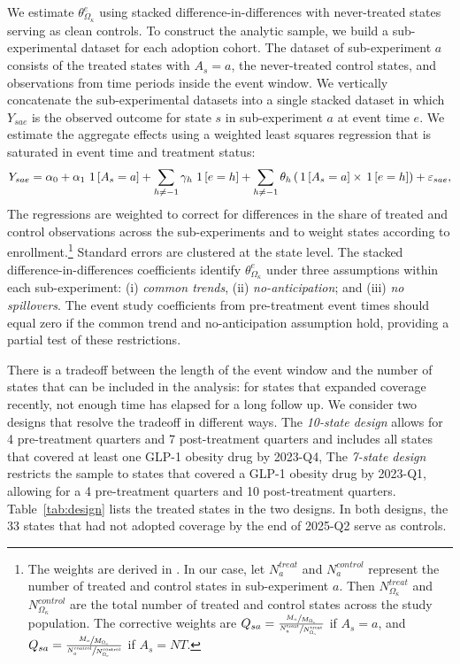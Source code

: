 We estimate $\theta_{\Omega_{\kappa}}^{e}$ using stacked difference-in-differences with never-treated states serving as clean controls. To construct the analytic sample, we build a sub-experimental dataset for each adoption cohort. The dataset of sub-experiment $a$ consists of the treated states with $A_s = a$, the never-treated control states, and observations from time periods inside the event window. We vertically concatenate the sub-experimental datasets into a single stacked dataset in which $Y_{sae}$ is the observed outcome for state $s$ in sub-experiment $a$ at event time $e$. We estimate the aggregate effects using a weighted least squares regression that is saturated in event time and treatment status:
%
\begin{equation*}
  Y_{sae} = \alpha_0 + \alpha_1 \one{A_s = a} + \sum_{h \ne -1} \gamma_h \one{e = h} + \sum_{h \ne -1} \theta_h \bp{\one{A_s = a} \times \one{e = h}} + \varepsilon_{sae},
\end{equation*}
%
The regressions are weighted to correct for differences in the share of treated and control observations across the sub-experiments and to weight states according to enrollment.\footnote{The weights are derived in \citet{wing2024stacked}. In our case, let $N_a^{treat}$ and $N_a^{control}$ represent the number of treated and control states in sub-experiment $a$. Then $N_{\Omega_{\kappa}}^{treat}$ and $N_{\Omega_{\kappa}}^{control}$ are the total number of treated and control states across the study population. The corrective weights are $Q_{sa} = \frac{\sfrac{M_a}{M_{\Omega_{\kappa}}}}{\sfrac{N_a^{\text{treat}}}{N_{\Omega_{\kappa}}^{\text{treat}}}}$ if $A_s = a$, and $Q_{sa} = \frac{\sfrac{M_a}{M_{\Omega_{\kappa}}}}{\sfrac{N_a^{\text{control}}}{N_{\Omega_{\kappa}}^{\text{control}}}}$ if $A_s = NT$.}  Standard errors are clustered at the state level. The stacked difference-in-differences coefficients identify $\theta_{\Omega_{\kappa}}^{e}$ under three assumptions within each sub-experiment: (i) \emph{common trends}, (ii) \emph{no-anticipation}; and (iii) \emph{no spillovers}. The event study coefficients from pre-treatment event times should equal zero if the common trend and no-anticipation assumption hold, providing a partial test of these restrictions. 

There is a tradeoff between the length of the event window and the number of states that can be included in the analysis: for states that expanded coverage recently, not enough time has elapsed for a long follow up. We consider two designs that resolve the tradeoff in different ways. The \emph{10-state design} allows for 4 pre-treatment quarters and 7 post-treatment quarters and includes all states that covered at least one GLP-1 obesity drug by 2023-Q4, The \emph{7-state design} restricts the sample to states that covered a GLP-1 obesity drug by 2023-Q1, allowing for a 4 pre-treatment quarters and 10 post-treatment quarters. Table~\ref{tab:design} lists the treated states in the two designs. In both designs, the 33 states that had not adopted coverage by the end of 2025-Q2 serve as controls. 
